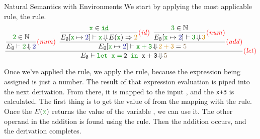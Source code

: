 \begin{example}[Lecture 3]{Natural Semantics with Environments}
  We start by applying the most applicable rule, the  rule.
  \begin{equation*}
    \dfrac{
      \dfrac{\SemanticInput{2} \in \NaturalNumbers}{E_{\emptyset} \vdash \SemanticInput{2} \EvaluatesTo \textcolor{Blue4}{2}} \SemanticRuleName{num} \:\:
      \dfrac{
        \dfrac{\SemanticInput{\mathtt{x}} \in \SemanticInput{\mathtt{\underline{id}}}}
        {E_{\emptyset} [\SemanticInput{\mathtt{x}} \mapsto \textcolor{Blue4}{2}] \vdash \SemanticInput{\mathtt{x}} \EvaluatesTo E(\SemanticInput{\mathtt{x}}) \Rightarrow \OrangeText{2}} \SemanticRuleName{id} \:\:
        \dfrac{\SemanticInput{3} \in \NaturalNumbers}
        {E_{\emptyset} [\SemanticInput{\mathtt{x}} \mapsto \textcolor{Blue4}{2}] \vdash \SemanticInput{3} \EvaluatesTo \OrangeText{3}} \SemanticRuleName{num}}
      {E_{\emptyset}[\SemanticInput{\mathtt{x}} \mapsto \textcolor{Blue4}{2}] \vdash \SemanticInput{\mathtt{x+3}} \EvaluatesTo \OrangeText{2+3} = \textcolor{Burlywood4}{5}} \SemanticRuleName{add}}
    {E_{\emptyset} \vdash \SemanticInput{\text{\texttt{let }}} \mathtt{\SemanticInput{x=}\,2} \SemanticInput{\text{\texttt{ in }}} \mathtt{x+3} \EvaluatesTo \textcolor{Burlywood4}{5}} \SemanticRuleName{let}
  \end{equation*}

  Once we've applied the  rule, we apply the  rule, because the expression being assigned is just a number.
  The result of that expression evaluation is piped into the next  derivation.
  From there, it is mapped to the input , and the \texttt{x+3} is calculated.
  The first thing is to get the value of  from the mapping with the  rule.
  Once the $E(\SemanticInput{\mathtt{x}})$ returns the value of the variable , we can use it.
  The other operand in the addition is found using the  rule.
  Then the addition occurs, and the derivation completes.
\end{example}

